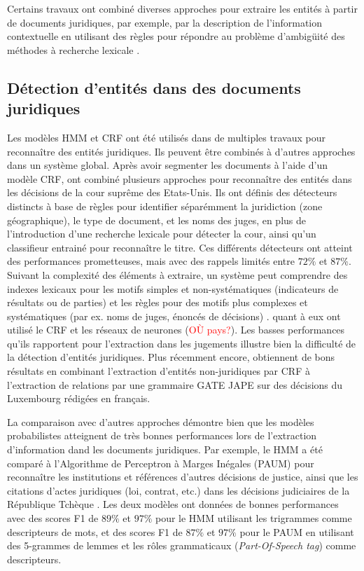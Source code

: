 Certains travaux ont combiné diverses approches pour extraire les entités à partir de documents juridiques,  par exemple,  par la description de l'information contextuelle en utilisant des règles pour répondre au problème d'ambigüité des méthodes à recherche lexicale \citep{mikheev1999NERlexicalWithRules,hanisch2005prominer}. 

\subsection{Détection d'entités dans des documents juridiques}

Les modèles HMM et CRF ont été utilisés dans de multiples travaux pour reconnaître des entités juridiques. Ils peuvent être combinés à d'autres approches dans un système global. Après avoir segmenter les documents à l'aide d'un modèle CRF, \citet{dozier2010legalnerr} ont combiné plusieurs approches pour reconnaître des entités dans les décisions de la cour suprême des Etats-Unis. Ils ont définis des détecteurs distincts à base de règles pour identifier séparémment la juridiction (zone géographique), le type de document, et les noms des juges, en plus de l'introduction d'une recherche lexicale pour détecter la cour, ainsi qu'un classifieur entrainé pour reconnaître le titre. Ces différents détecteurs ont atteint des performances prometteuses, mais avec des rappels limités entre $ 72 \% $ et $ 87 \% $. Suivant la complexité des éléments à extraire, un système peut comprendre des indexes lexicaux pour les motifs simples et non-systématiques (indicateurs de résultats ou de parties) et les règles pour des motifs plus complexes et systématiques (par ex. noms de juges, énoncés de décisions) \citep{Waltl2016lexia, wyner2010extractlegalelts}. \cite{cardellino2017legalNERCL} quant à eux ont utilisé le CRF et les réseaux de neurones (\textcolor{red}{OÙ pays?}). Les basses performances qu'ils rapportent pour l'extraction dans les jugements illustre bien la difficulté de la détection d'entités juridiques. Plus récemment encore, \citet{andrew2018legalNerAndRelation} obtiennent de bons résultats en combinant l'extraction d'entités non-juridiques par CRF à l'extraction de relations par une grammaire GATE JAPE \citep{thakker2009gatejape} sur des décisions du Luxembourg rédigées en français.

La comparaison avec d'autres approches démontre bien que les modèles probabilistes atteignent de très bonnes performances lors de l'extraction d'information dand les documents juridiques. Par exemple, le HMM a été comparé à l'Algorithme de Perceptron à Marges Inégales (PAUM) \citep{li2002PAUM} pour reconnaître les institutions et références d'autres décisions de justice, ainsi que les citations d'actes juridiques (loi, contrat, etc.) dans les décisions judiciaires de la République Tchèque \citep{Kriz2014nerinczechdecisions}. Les deux modèles ont données de bonnes performances avec des scores F1 de $ 89 \% $ et $ 97 \% $ pour le HMM utilisant les trigrammes comme descripteurs de mots, et des scores F1 de $ 87 \% $ et $ 97 \% $ pour le PAUM en utilisant des 5-grammes de lemmes et les rôles grammaticaux (\textit{Part-Of-Speech tag}) comme descripteurs. 


